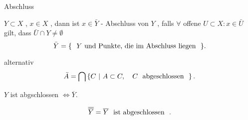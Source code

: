 \documentclass[class=article, crop=false]{standalone}
\begin{document}
\begin{zettel}{Abschluss}
\begin{flashcard}
    \begin{definition}[Abschluss]
        $Y \subset X$ , $x \in  X$ , dann ist $x \in  \bar{Y} $ - Abschluss von $Y$ , falls  $\forall $ offene $U \subset X : x \in  \bar{U} $ gilt, dass $ \bar{U} \cap Y \neq  \emptyset$ 
        \[
            \bar{Y} =  \set{ \tx{ $Y$ und Punkte, die im Abschluss liegen } }
        .\]
    \end{definition}
\end{flashcard}

alternativ
\[
    \bar{A} = \bigcap \set{C}{A \subset C,\quad C  \tx{ abgeschlossen } }
.\]
\begin{lemma}
    $Y$ ist abgschlossen $\iff \overline{Y} $.
\end{lemma}

\begin{corollary}
    \[
        \overline{\overline{Y}} = \overline{Y} \tx{ ist abgeschlossen } 
    .\]
\end{corollary}
\end{zettel}
\end{document}
